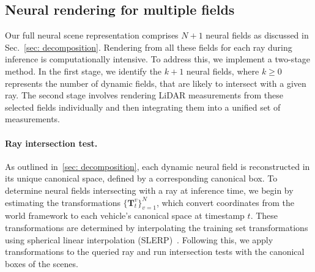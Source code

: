 


\subsection{Neural rendering for multiple fields}\label{sec:neural_fields_composition}
Our full neural scene representation comprises $N+1$ neural fields as discussed in Sec.~\ref{sec: decomposition}. Rendering from all these fields for each ray during inference is computationally intensive. To address this, we implement a two-stage method. In the first stage, we identify the $k+1$ neural fields, where $k \geq 0$ represents the number of dynamic fields, that are likely to intersect with a given ray. The second stage involves rendering LiDAR measurements from these selected fields individually and then integrating them into a unified set of measurements.


\paragraph{Ray intersection test.}
As outlined in~\cref{sec: decomposition}, each dynamic neural field is reconstructed in its unique canonical space, defined by a corresponding canonical box. To determine neural fields intersecting with a ray at inference time, we begin by estimating the transformations $\{\mathbf{T}_t^v\}_{v=1}^N$, which convert coordinates from the world framework to each vehicle's canonical space at timestamp $t$. These transformations are determined by interpolating the training set transformations using spherical linear interpolation (SLERP)~\cite{10.1145/325334.325242}. Following this, we apply transformations to the queried ray and run intersection tests with the canonical boxes of the scenes. 


